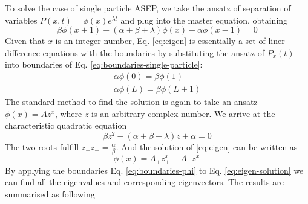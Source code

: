 \documentclass[12pt,a4paper]{article}
\begin{document}
To solve the case of single particle ASEP, we take the ansatz of separation of
variables $P(x,t) = \phi(x)e^{\lambda t}$ and plug into the master equation,
obtaining 
\begin{equation}
    \label{eq:eigen}
    \beta\phi(x+1) -(\alpha+\beta+\lambda)\phi(x) + \alpha\phi(x-1) = 0
\end{equation}
Given that $x$ is an integer number, Eq. \eqref{eq:eigen} is essentially a set
of liner difference equations with the boundaries by substituting the ansatz of
$P_x(t)$ into boundaries of Eq. \eqref{eq:boundaries-single-particle}: 
\begin{subequations}
    \label{eq:boundaries-phi}
\begin{eqnarray}
    \alpha\phi(0) = \beta\phi(1) \\
    \alpha \phi(L) = \beta \phi(L+1)
\end{eqnarray}
\end{subequations}
The standard method to find the solution is again to take an ansatz $\phi(x) =
Az^x$, where $z$ is an arbitrary complex number. We arrive at the characteristic
quadratic equation 
\begin{equation}
    \label{eq:characteristic}
    \beta z^2 - (\alpha + \beta + \lambda ) z + \alpha = 0
\end{equation}
The two roots fulfill $z_+z_- = \frac{\alpha}{\beta}$. And the solution of
\eqref{eq:eigen} can be written as 
\begin{equation}
    \label{eq:eigen-solution}
    \phi(x) = A_+ z_+^{x} + A_- z_-^{x}
\end{equation}
By applying the boundaries Eq. \eqref{eq:boundaries-phi} to Eq.
\eqref{eq:eigen-solution} we can find all the eigenvalues and corresponding
eigenvectors. The results are summarised as following
\end{document}
